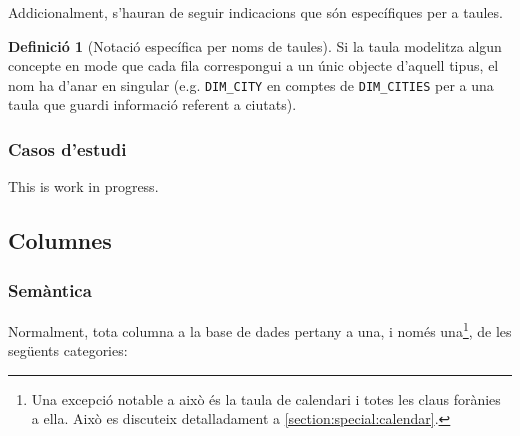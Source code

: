 \documentclass{article}
\theoremstyle{definition}
\newtheorem{definition}{Definició}
\begin{document}
Addicionalment, s'hauran de seguir indicacions que són específiques per a taules.

\begin{definition}[Notació específica per noms de taules]\label{def:tables:notation}
Si la taula modelitza algun concepte en mode que cada fila correspongui a un únic objecte d'aquell tipus, el nom ha d'anar en singular (e.g. \verb|DIM_CITY| en comptes de \verb|DIM_CITIES| per a una taula que guardi informació referent a ciutats).
\end{definition}

\subsubsection{Casos d'estudi}\label{section:nomenclature:tables:examples}
This is work in progress.

\subsection{Columnes}\label{section:nomenclature:columns}
\subsubsection{Semàntica}\label{section:nomenclature:columns:semantics}
Normalment, tota columna a la base de dades pertany a una, i només una\footnote{Una excepció notable a això és la taula de calendari i totes les claus forànies a ella. Això es discuteix detalladament a \cref{section:special:calendar}.}, de les següents categories:
\end{document}
